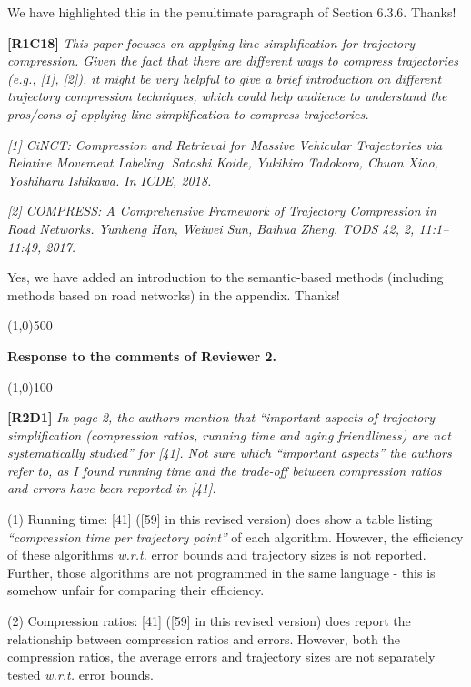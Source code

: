 \documentclass{letter}
\newcommand{\wrt}{\emph{w.r.t.}\xspace}
\begin{document}
We have highlighted this in the penultimate paragraph of Section 6.3.6.
Thanks!

\textbf{[R1C18]} \emph{ This paper focuses on applying line simplification for trajectory compression. Given the fact that there are different ways to compress trajectories (e.g., [1], [2]), it might be very helpful to give a brief introduction on different trajectory compression techniques, which could help audience to understand the pros/cons of applying line simplification to compress trajectories. }

\emph{ [1] CiNCT: Compression and Retrieval for Massive Vehicular Trajectories via Relative Movement Labeling. Satoshi Koide, Yukihiro Tadokoro, Chuan Xiao, Yoshiharu Ishikawa. In ICDE, 2018.}

\emph{ [2] COMPRESS: A Comprehensive Framework of Trajectory Compression in Road Networks. Yunheng Han, Weiwei Sun, Baihua Zheng. TODS 42, 2, 11:1--11:49, 2017.}


{Yes, we have added an introduction to the semantic-based methods (including methods based on road networks) in the appendix. Thanks!}

\line(1,0){500}

\textbf{Response to the comments of Reviewer 2.}

\line(1,0){100}

\textbf{[R2D1]} \emph{In page 2, the authors mention that ``important aspects of trajectory simplification (compression ratios, running time and aging friendliness) are not systematically studied'' for [41]. Not sure which ``important aspects'' the authors refer to, as I found running time and the trade-off between compression ratios and errors have been reported in [41].}

(1) Running time: [41] ([59] in this revised version) does show a table listing \emph{``compression time per trajectory point''} of each algorithm.  However, the efficiency of these algorithms \wrt error bounds and trajectory sizes is not reported. Further, those algorithms are not programmed in the same language - this is somehow unfair for comparing their efficiency.

(2) Compression ratios: [41] ([59] in this revised version)  does report the relationship between compression ratios and errors. However, both the compression ratios, the average errors and trajectory sizes are not separately tested \wrt error bounds.
\end{document}
